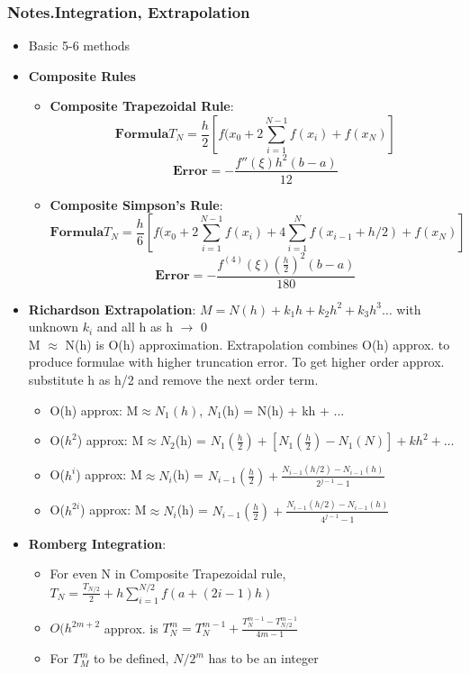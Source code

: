 \documentclass[12pt,letterpaper]{article}
\newcommand\asgnname{Notes}         %
\newenvironment{answer}[1]{
  \subsubsection*{%
  \asgnname.#1}
}{\newpage}
\begin{document}
\begin{answer}{Integration, Extrapolation}
\begin{itemize}
    \item Basic 5-6 methods
    \item \textbf{Composite Rules}
    \begin{itemize}
        \item \textbf{Composite Trapezoidal Rule}: \\
        \[
            \textbf{Formula} T_N = \frac{h}{2} [f(x_0 + 2\sum _{i=1}^{N-1}f(x_i) + f(x_N)]
        \] \[
            \textbf{Error} = -\frac{f''(\xi)h^2(b-a)}{12}
        \]
        \item \textbf{Composite Simpson's Rule}: \\
        \[
            \textbf{Formula}  T_N = \frac{h}{6} [f(x_0 + 2\sum _{i=1}^{N-1}f(x_i) + 4\sum _{i=1}^N f(x_{i-1}+h/2) +f(x_N)]
        \] \[
            \textbf{Error} = -\frac{f^{(4)}(\xi)(\frac{h}{2})^2(b-a)}{180}
        \]
    \end{itemize}
    \item \textbf{Richardson Extrapolation}: $M = N(h) + k_1h + k_2h^2 + k_3h^3 \ldots$ with unknown $k_i$ and all h as h $\to$ 0\\
    M $\approx$ N(h) is O(h) approximation. Extrapolation combines O(h) approx. to produce formulae with higher truncation error. To get higher order approx. substitute h as h/2 and remove the next order term.
    \begin{itemize}
        \item O(h) approx: M$\approx N_1(h)$, $N_1$(h) = N(h) + kh + $\ldots$
        \item O($h^2$) approx: M$\approx N_2$(h) = $N_1(\frac{h}{2})+[N_1(\frac{h}{2})-N_1(N)] + kh^2 + \ldots$
        \item O($h^i$) approx: M$\approx N_i$(h) = $N_{i-1}(\frac{h}{2}) + \frac{N_{i-1}(h/2) - N_{i-1}(h)}{2^{j-1} - 1}$
        \item O($h^{2i}$) approx: M$\approx N_i$(h) = $N_{i-1}(\frac{h}{2}) + \frac{N_{i-1}(h/2) - N_{i-1}(h)}{4^{j-1} - 1}$
    \end{itemize}
    \item \textbf{Romberg Integration}:
    \begin{itemize}
        \item For even N in Composite Trapezoidal rule, $T_N = \frac{T_{N/2}}{2} + h\sum _{i=1}^{N/2} f(a+(2i-1)h)$
        \item $O(h^{2m+2}$ approx. is $T_N^m = T_N^{m-1} + \frac{T_N^{m-1} - T^{m-1}_{N/2}}{4m -1}$
        \item For $T_M^m$ to be defined, $N/2^m$ has to be an integer
    \end{itemize}
    
\end{itemize}
\end{answer}
\end{document}
